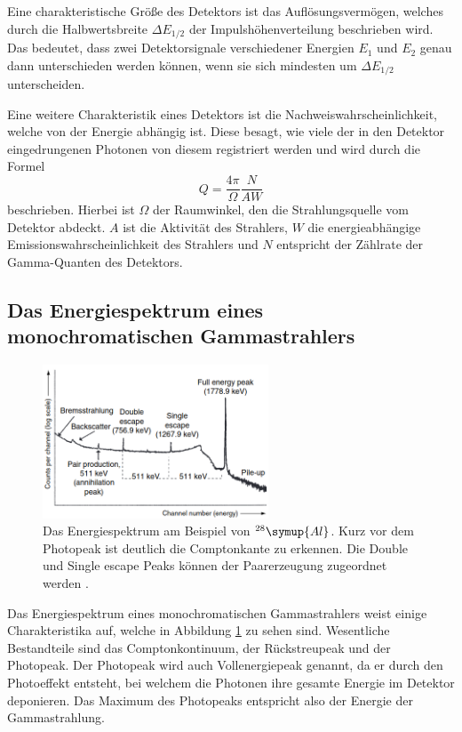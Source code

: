 Eine charakteristische Größe des Detektors ist das Auflösungsvermögen, welches durch die Halbwertsbreite $\Delta E_{1/2}$ der Impulshöhenverteilung beschrieben wird.
Das bedeutet, dass zwei Detektorsignale verschiedener Energien $E_1$ und $E_2$ genau dann unterschieden werden können, wenn sie sich mindesten um $\Delta E_{1/2}$ unterscheiden.

Eine weitere Charakteristik eines Detektors ist die Nachweiswahrscheinlichkeit, welche von der Energie abhängig ist.
Diese besagt, wie viele der in den Detektor eingedrungenen Photonen von diesem registriert werden und wird durch die Formel
\begin{equation}
Q=\frac{4\pi}{\Omega}\frac{N}{AW}
\end{equation}
beschrieben.
Hierbei ist $\Omega$ der Raumwinkel, den die Strahlungsquelle vom Detektor abdeckt.
$A$ ist die Aktivität des Strahlers, $W$ die energieabhängige Emissionswahrscheinlichkeit des Strahlers und $N$ entspricht der Zählrate der Gamma-Quanten des Detektors.

\subsection{Das Energiespektrum eines monochromatischen Gammastrahlers}
\FloatBarrier
\begin{figure}
\centering
\includegraphics[width = 0.6\textwidth]{Spektrum.png}
\caption{Das Energiespektrum am Beispiel von $^{28}\symup{Al}$. Kurz vor dem Photopeak ist deutlich die Comptonkante zu erkennen. Die Double und Single escape Peaks können der Paarerzeugung zugeordnet werden \cite{quelle02}.}
\label{fig:tfig8}
\end{figure}
\FloatBarrier
Das Energiespektrum eines monochromatischen Gammastrahlers weist einige Charakteristika auf, welche in Abbildung \ref{fig:tfig8} zu sehen sind.
Wesentliche Bestandteile sind das Comptonkontinuum, der Rückstreupeak und der Photopeak.
Der Photopeak wird auch Vollenergiepeak genannt, da er durch den Photoeffekt entsteht, bei welchem die Photonen ihre gesamte Energie im Detektor deponieren.
Das Maximum des Photopeaks entspricht also der Energie der Gammastrahlung.

